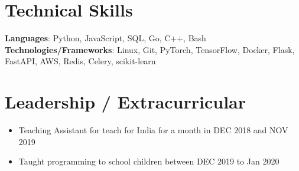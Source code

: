 \documentclass[letterpaper,10pt]{article}
\newcommand{\resumeItem}[1]{
  \item\small{
    {#1 \vspace{-2pt}}
  }
}
\newcommand{\resumeItemListStart}{\begin{itemize}}
\newcommand{\resumeItemListEnd}{\end{itemize}\vspace{-5pt}}
\begin{document}
%
\section{Technical Skills}
 \begin{itemize}
    \small{\item{
     \textbf{Languages}{: Python, JavaScript, SQL, Go, C++, Bash} \\
     \textbf{Technologies/Frameworks}{: Linux, Git, PyTorch, TensorFlow, Docker, Flask, FastAPI, AWS, Redis, Celery, scikit-learn} \\
    }}
 \end{itemize}
 \vspace{-16pt}


\section{Leadership / Extracurricular}
            \resumeItemListStart
                \resumeItem{Teaching Assistant for teach for India for a month in DEC 2018 and NOV 2019}
                \resumeItem{Taught programming to school children between DEC 2019 to Jan 2020}
            \resumeItemListEnd
\end{document}
